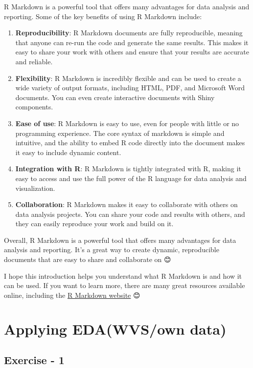 \documentclass[
]{book}
\begin{document}
R Markdown is a powerful tool that offers many advantages for data analysis and reporting. Some of the key benefits of using R Markdown include:

\begin{enumerate}
\def\labelenumi{\arabic{enumi}.}
\item
  \textbf{Reproducibility}: R Markdown documents are fully reproducible, meaning that anyone can re-run the code and generate the same results. This makes it easy to share your work with others and ensure that your results are accurate and reliable.
\item
  \textbf{Flexibility}: R Markdown is incredibly flexible and can be used to create a wide variety of output formats, including HTML, PDF, and Microsoft Word documents. You can even create interactive documents with Shiny components.
\item
  \textbf{Ease of use}: R Markdown is easy to use, even for people with little or no programming experience. The core syntax of markdown is simple and intuitive, and the ability to embed R code directly into the document makes it easy to include dynamic content.
\item
  \textbf{Integration with R}: R Markdown is tightly integrated with R, making it easy to access and use the full power of the R language for data analysis and visualization.
\item
  \textbf{Collaboration}: R Markdown makes it easy to collaborate with others on data analysis projects. You can share your code and results with others, and they can easily reproduce your work and build on it.
\end{enumerate}

Overall, R Markdown is a powerful tool that offers many advantages for data analysis and reporting. It's a great way to create dynamic, reproducible documents that are easy to share and collaborate on 😊

I hope this introduction helps you understand what R Markdown is and how it can be used. If you want to learn more, there are many great resources available online, including the \href{\%5E1\%5E}{R Markdown website} 😊

\hypertarget{applying-edawvsown-data}{%
\section{Applying EDA(WVS/own data)}\label{applying-edawvsown-data}}

\hypertarget{exercise---1}{%
\subsection{Exercise - 1}\label{exercise---1}}
\end{document}
